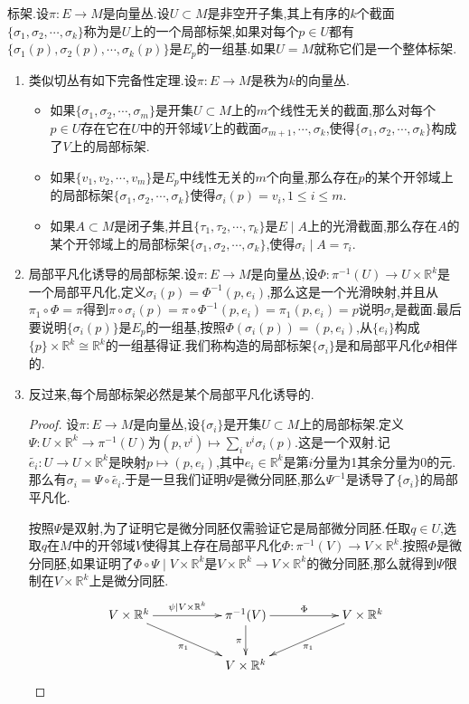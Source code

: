 标架.设$\pi:E\to M$是向量丛.设$U\subset M$是非空开子集,其上有序的$k$个截面$\{\sigma_1,\sigma_2,\cdots,\sigma_k\}$称为是$U$上的一个局部标架,如果对每个$p\in U$都有$\{\sigma_1(p),\sigma_2(p),\cdots,\sigma_k(p)\}$是$E_p$的一组基.如果$U=M$就称它们是一个整体标架.
\begin{enumerate}
	\item 类似切丛有如下完备性定理.设$\pi:E\to M$是秩为$k$的向量丛.
	\begin{itemize}
		\item 如果$\{\sigma_1,\sigma_2,\cdots,\sigma_m\}$是开集$U\subset M$上的$m$个线性无关的截面,那么对每个$p\in U$存在它在$U$中的开邻域$V$上的截面$\sigma_{m+1},\cdots,\sigma_k$,使得$\{\sigma_1,\sigma_2,\cdots,\sigma_k\}$构成了$V$上的局部标架.
		\item 如果$\{v_1,v_2,\cdots,v_m\}$是$E_p$中线性无关的$m$个向量,那么存在$p$的某个开邻域上的局部标架$\{\sigma_1,\sigma_2,\cdots,\sigma_k\}$使得$\sigma_i(p)=v_i,1\le i\le m$.
		\item 如果$A\subset M$是闭子集,并且$\{\tau_1,\tau_2,\cdots,\tau_k\}$是$E\mid A$上的光滑截面,那么存在$A$的某个开邻域上的局部标架$\{\sigma_1,\sigma_2,\cdots,\sigma_k\}$,使得$\sigma_i\mid A=\tau_i$.
	\end{itemize}
    \item 局部平凡化诱导的局部标架.设$\pi:E\to M$是向量丛,设$\Phi:\pi^{-1}(U)\to U\times\mathbb{R}^k$是一个局部平凡化,定义$\sigma_i(p)=\Phi^{-1}(p,e_i)$,那么这是一个光滑映射,并且从$\pi_1\circ\Phi=\pi$得到$\pi\circ\sigma_i(p)=\pi\circ\Phi^{-1}(p,e_i)=\pi_1(p,e_i)=p$说明$\sigma_i$是截面.最后要说明$\{\sigma_i(p)\}$是$E_p$的一组基,按照$\Phi(\sigma_i(p))=(p,e_i)$,从$\{e_i\}$构成$\{p\}\times\mathbb{R}^k\cong\mathbb{R}^k$的一组基得证.我们称构造的局部标架$\{\sigma_i\}$是和局部平凡化$\Phi$相伴的.
    \item 反过来,每个局部标架必然是某个局部平凡化诱导的.
    \begin{proof}
    	
    	设$\pi:E\to M$是向量丛,设$\{\sigma_i\}$是开集$U\subset M$上的局部标架.定义$\Psi:U\times\mathbb{R}^k\to\pi^{-1}(U)$为$(p,v^i)\mapsto\sum_iv^i\sigma_i(p)$.这是一个双射.记$\widetilde{e_i}:U\to U\times\mathbb{R}^k$是映射$p\mapsto(p,e_i)$,其中$e_i\in\mathbb{R}^k$是第$i$分量为1其余分量为0的元.那么有$\sigma_i=\Psi\circ\widetilde{e_i}$.于是一旦我们证明$\Psi$是微分同胚,那么$\Psi^{-1}$是诱导了$\{\sigma_i\}$的局部平凡化.
    	
    	按照$\Psi$是双射,为了证明它是微分同胚仅需验证它是局部微分同胚.任取$q\in U$,选取$q$在$M$中的开邻域$V$使得其上存在局部平凡化$\Phi:\pi^{-1}(V)\to V\times\mathbb{R}^k$.按照$\Phi$是微分同胚,如果证明了$\Phi\circ\Psi\mid V\times\mathbb{R}^k$是$V\times\mathbb{R}^k\to V\times\mathbb{R}^k$的微分同胚,那么就得到$\Psi$限制在$V\times\mathbb{R}^k$上是微分同胚.
    	$$\xymatrix{V\times\mathbb{R}^k\ar[rr]^{\psi\mid V\times\mathbb{R}^k}\ar[drr]_{\pi_1}&&\pi^{-1}(V)\ar[rr]^{\Phi}\ar[d]_{\pi}&&V\times\mathbb{R}^k\ar[dll]^{\pi_1}\\&&V\times\mathbb{R}^k&&}$$
    	

\end{proof}
\end{enumerate}
